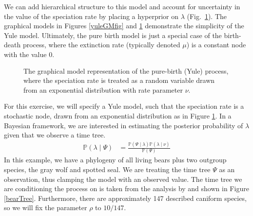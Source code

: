 We can add hierarchical structure to this model and account for uncertainty in the value of the speciation rate by placing a hyperprior on $\lambda$ (Fig.~\ref{yuleGMfig2}). The graphical models in Figures \ref{yuleGMfig} and \ref{yuleGMfig2} demonstrate the simplicity of the Yule model. 
Ultimately, the pure birth model is just a special case of the birth-death process, where the extinction rate (typically denoted $\mu$) is a constant node with the value 0. 
\begin{figure}[h!]
\centering
{}
\caption{\small The graphical model representation of the pure-birth (Yule) process, where the speciation rate is treated as a random variable drawn from an exponential distribution with rate parameter $\nu$.}
\label{yuleGMfig2}
\end{figure}

For this exercise, we will specify a Yule model, such that the speciation rate is a stochastic node, drawn from an exponential distribution as in Figure \ref{yuleGMfig2}.
In a Bayesian framework, we are interested in estimating the posterior probability of $\lambda$ given that we observe a time tree.
\begin{align}\label{bayesTher}
\mathbb{P}(\lambda \mid \Psi) &= \frac{\mathbb{P}(\Psi \mid \lambda)\mathbb{P}(\lambda \mid \nu)}{\mathbb{P}(\Psi)}
\end{align}
In this example, we have a phylogeny of all living bears plus two outgroup species, the gray wolf and spotted seal. 
We are treating the time tree $\Psi$ as an observation, thus clamping the model with an observed value.
The time tree we are conditioning the process on is taken from the analysis by \citet{dosReis2012} and shown in Figure \ref{bearTree}.
Furthermore, there are approximately 147 described caniform species, so we will fix the parameter $\rho$ to $10/147$.



